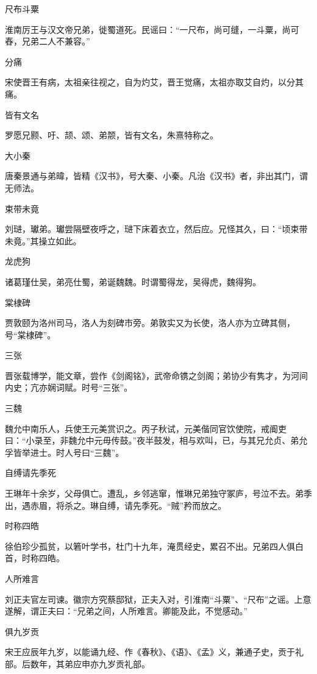 \documentclass[a4paper,12pt,UTF8,twoside]{ctexbook}
\begin{document}
    尺布斗粟
    
    淮南厉王与汉文帝兄弟，徙蜀道死。民谣曰：“一尺布，尚可缝，一斗粟，尚可舂，兄弟二人不兼容。”
    
    分痛
    
    宋使晋王有病，太祖亲往视之，自为灼艾，晋王觉痛，太祖亦取艾自灼，以分其痛。
    
    皆有文名
    
    罗愿兄颢、吁、颉、颂、弟颒，皆有文名，朱熹特称之。
    
    大小秦
    
    唐秦景通与弟暐，皆精《汉书》，号大秦、小秦。凡治《汉书》者，非出其门，谓无师法。
    
    束带未竟
    
    刘琎，瓛弟。瓛尝隔壁夜呼之，琎下床着衣立，然后应。兄怪其久，曰：“顷束带未竟。”其操立如此。
    
    龙虎狗
    
    诸葛瑾仕吴，弟亮仕蜀，弟诞魏魏。时谓蜀得龙，吴得虎，魏得狗。
    
    棠棣碑
    
    贾敦颐为洛州司马，洛人为刻碑市旁。弟敦实又为长使，洛人亦为立碑其侧，号“棠棣碑”。
    
    三张
    
    晋张载博学，能文章，尝作《剑阁铭》，武帝命镌之剑阁；弟协少有隽才，为河间内史；亢亦娴词赋。时号“三张”。
    
    三魏
    
    魏允中南乐人，兵使王元美赏识之。丙子秋试，元美偕同官饮使院，戒阍吏曰：“小录至，非魏允中元毋传鼓。”夜半鼓发，相与欢叫，已，与其兄允贞、弟允孚皆举进士。时人号曰“三魏”。
    
    自缚请先季死
    
    王琳年十余岁，父母俱亡。遭乱，乡邻逃窜，惟琳兄弟独守冢庐，号泣不去。弟季出，遇赤眉，将杀之。琳自缚，请先季死。“贼”矜而放之。
    
    时称四皓
    
    徐伯珍少孤贫，以箬叶学书，杜门十九年，淹贯经史，累召不出。兄弟四人俱白首，时称四皓。
    
    人所难言
    
    刘正夫官左司谏。徽宗方究蔡邸狱，正夫入对，引淮南“斗粟”、“尺布”之谣。上意遂解，谓正夫曰：“兄弟之间，人所难言。卿能及此，不觉感动。”
    
    俱九岁贡
    
    宋王应辰年九岁，以能诵九经、作《春秋》、《语》、《孟》义，兼通子史，贡于礼部。后数年，其弟应申亦九岁贡礼部。
    
\end{document}
